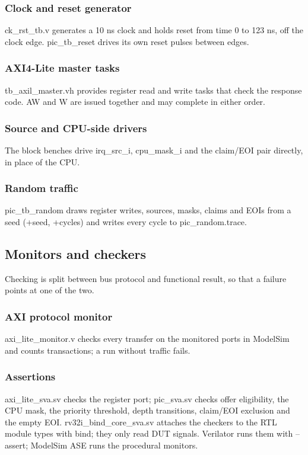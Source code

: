 \documentclass[11pt]{article}
\begin{document}
\subsubsection{Clock and reset generator}
\noindent ck\_rst\_tb.v generates a 10 ns clock and holds reset from time 0 to 123 ns, off the clock edge. pic\_tb\_reset drives its own reset pulses between edges.\par\medskip
\subsubsection{AXI4-Lite master tasks}
\noindent tb\_axil\_master.vh provides register read and write tasks that check the response code. AW and W are issued together and may complete in either order.\par\medskip
\subsubsection{Source and CPU-side drivers}
\noindent The block benches drive irq\_src\_i, cpu\_mask\_i and the claim/EOI pair directly, in place of the CPU.\par\medskip
\subsubsection{Random traffic}
\noindent pic\_tb\_random draws register writes, sources, masks, claims and EOIs from a seed (+seed, +cycles) and writes every cycle to pic\_random.trace.\par\medskip

\subsection{Monitors and checkers}
\noindent Checking is split between bus protocol and functional result, so that a failure points at one of the two.\par\medskip
\subsubsection{AXI protocol monitor}
\noindent axi\_lite\_monitor.v checks every transfer on the monitored ports in ModelSim and counts transactions; a run without traffic fails.\par\medskip
\subsubsection{Assertions}
\noindent axi\_lite\_sva.sv checks the register port; pic\_sva.sv checks offer eligibility, the CPU mask, the priority threshold, depth transitions, claim/EOI exclusion and the empty EOI. rv32i\_bind\_core\_sva.sv attaches the checkers to the RTL module types with bind; they only read DUT signals. Verilator runs them with --assert; ModelSim ASE runs the procedural monitors.\par\medskip
\end{document}
